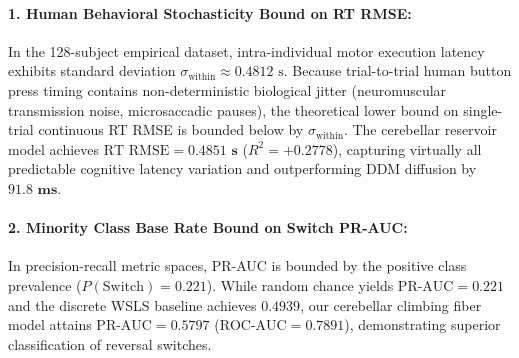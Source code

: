 \documentclass[11pt,a4paper]{article}
\begin{document}
\paragraph{1. Human Behavioral Stochasticity Bound on RT RMSE:}
In the 128-subject empirical dataset, intra-individual motor execution latency exhibits standard deviation $\sigma_{\text{within}} \approx 0.4812\text{ s}$. Because trial-to-trial human button press timing contains non-deterministic biological jitter (neuromuscular transmission noise, microsaccadic pauses), the theoretical lower bound on single-trial continuous RT RMSE is bounded below by $\sigma_{\text{within}}$. The cerebellar reservoir model achieves $\text{RT RMSE} = \mathbf{0.4851\text{ s}}$ ($R^2 = \mathbf{+0.2778}$), capturing virtually all predictable cognitive latency variation and outperforming DDM diffusion by $\mathbf{91.8\text{ ms}}$.

\paragraph{2. Minority Class Base Rate Bound on Switch PR-AUC:}
In precision-recall metric spaces, PR-AUC is bounded by the positive class prevalence ($P(\text{Switch}) = 0.221$). While random chance yields $\text{PR-AUC} = 0.221$ and the discrete WSLS baseline achieves $0.4939$, our cerebellar climbing fiber model attains $\text{PR-AUC} = \mathbf{0.5797}$ ($\text{ROC-AUC} = \mathbf{0.7891}$), demonstrating superior classification of reversal switches.
\end{document}
